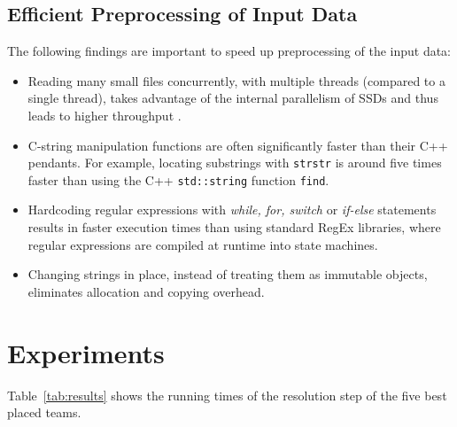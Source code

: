 \documentclass[sigconf]{acmart}
\begin{document}
\subsection{Efficient Preprocessing of Input Data}
\label{sub:sec:preprocessing}

The following findings are important to speed up preprocessing of the input data:

\begin{itemize}
\item Reading many small files concurrently, with multiple threads (compared to a single thread), takes advantage of the internal parallelism of SSDs and thus leads to higher throughput \cite{Zhuang2016}.

\item C-string manipulation functions are often significantly faster than their C++ pendants. For example, locating substrings with \texttt{strstr} is around five times faster than using the C++ \texttt{std::string} function \texttt{find}.

\item Hardcoding regular expressions with \emph{while, for, switch} or \emph{if-else} statements results in faster execution times than using standard RegEx libraries, where regular expressions are compiled at runtime into state machines.

\item Changing strings in place, instead of treating them as immutable objects, eliminates allocation and copying overhead.

\end{itemize}


\section{Experiments}

Table~\ref{tab:results} shows the running times of the resolution step of the five best placed teams.
\end{document}
